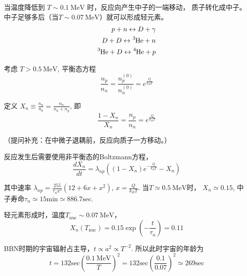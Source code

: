 \documentclass[]{ctexart}
\begin{document}
当温度降低到 $T\sim 0.1 \mathrm{~MeV}$ 时，反应向产生中子的一端移动， 质子转化成中子。
中子足够多后（当$T\sim 0.07 \mathrm{~MeV}$）就可以形成轻元素。
\begin{eqnarray}
    p+n \leftrightarrow D + \gamma \\ 
    D + D \leftrightarrow \ce{^{3}He} + n \\ 
    \ce{^{3}He} + D \leftrightarrow \ce{^{4}He} + p  
\end{eqnarray}


考虑 $T > 0.5 \mathrm{~MeV}$,%
平衡态方程
\begin{equation}
    \frac{n_p}{n_n} = \frac{n_p^{(0)}}{n_n^{(0)}} = e^\frac{Q}{k_B T}
\end{equation}

定义
$X_n\equiv \frac{n_n}{n_b} = \frac{n_n}{n_n+n_p}$,
即
\begin{equation}
    \frac{1-X_n}{X_n} = \frac{n_p}{n_n} = e^\frac{Q}{k_B T}
\end{equation}

（提问补充：在中微子退耦前，反应向质子一方移动。）

反应发生后需要使用非平衡态的Boltzmann方程，
\begin{equation}
    \frac{dX_n}{dt} = \lambda_{np} \left( \left(1-X_n\right) e^{-\frac{Q }{k_B T}}-X_n\right) 
\end{equation}

其中速率 $\lambda_{np} = \frac{255}{\tau_n x^5} \left(12+6x+x^2\right) $,  
$x=\frac{Q}{k_B T}$.
当$T\simeq 0.5 \mathrm{~MeV}$时，
$X_n \simeq 0.15$,
中子寿命$\tau_n \simeq 15\mathrm{min} \simeq 886.7 \mathrm{sec}$.

轻元素形成时，温度$T_\text{nuc}\sim 0.07 \mathrm{~MeV}$， 
\begin{equation}
    X_n\left(T_\text{nuc}\right) = 0.15 \exp\left(-\frac{t }{\tau_n}\right) =0.11
\end{equation}

BBN时期的宇宙辐射占主导，$t\propto a^2\propto T^{-2}$. 所以此时宇宙的年龄为
\begin{equation}
    t = 132 \mathrm{sec} \left(\frac{0.1 \mathrm{~MeV}}{T}\right)^2 =   132 \mathrm{sec} \left(\frac{0.1 }{0.07}\right)^2 \simeq 269 \mathrm{sec}
\end{equation}
\end{document}
